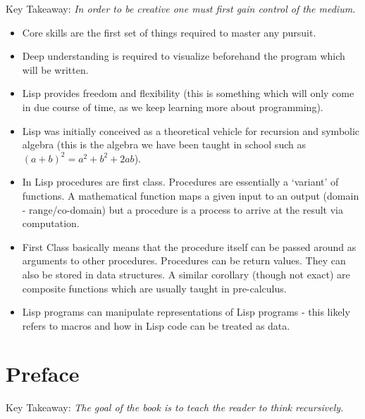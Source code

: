 \documentclass[11pt]{article}
\begin{document}
\vspace{1em}

Key Takeaway:
\emph{In order to be creative one must first gain control of the medium.}

\vspace{1em}

\begin{itemize}
\item Core skills are the first set of things required to master any pursuit.
\item Deep understanding is required to visualize beforehand the program which will be written.
\item Lisp provides freedom and flexibility (this is something which will only come in due course of time, as we keep
learning more about programming).
\item Lisp was initially conceived as a theoretical vehicle for recursion and symbolic algebra (this is the algebra we
have been taught in school such as \((a + b)^2 = a^2 + b^2 + 2ab\)).
\item In Lisp procedures are first class. Procedures are essentially a `variant' of functions. A mathematical function maps
a given input to an output (domain - range/co-domain) but a procedure is a process to arrive at the result via
computation.
\item First Class basically means that the procedure itself can be passed around as arguments to other procedures.
Procedures can be return values. They can also be stored in data structures. A similar corollary (though not exact)
are composite functions which are usually taught in pre-calculus.
\item Lisp programs can manipulate representations of Lisp programs - this likely refers to macros and how in Lisp code can
be treated as data.
\end{itemize}

\newpage
\section{Preface}
\label{sec:org268c75f}

Key Takeaway:
\emph{The goal of the book is to teach the reader to think recursively.}

\vspace{1em}
\end{document}
